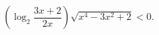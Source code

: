\begin{ex}[type=inequality]
	\begin{condition}
		$\left(\log_2 {\dfrac{3x + 2}{2x}}\right)\sqrt{x^4 - 3x^2 + 2}<0.$
	\end{condition}
\end{ex}